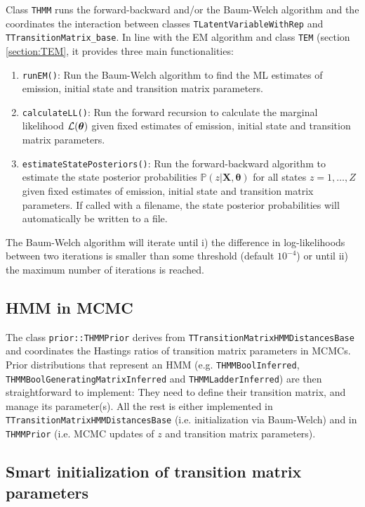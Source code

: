 \documentclass[a4paper,11pt]{article}
\def\X{\boldsymbol{X}}
\def\btheta{\boldsymbol{\theta}}
\def\L{{\cal L}}
\def\p{\mathbb{P}}
\newcommand{\class}[1]{\texttt{#1}}
\newcommand{\pubfunc}[1]{\texttt{#1()}}
\begin{document}
Class \class{THMM} runs the forward-backward and/or the Baum-Welch algorithm and the coordinates the interaction between classes \class{TLatentVariableWithRep} and \class{TTransitionMatrix\_base}. In line with the EM algorithm and class \class{TEM} (section \ref{section:TEM}, it provides three main functionalities:

\begin{enumerate}
 \item \pubfunc{runEM}: Run the Baum-Welch algorithm to find the ML estimates of emission, initial state and transition matrix parameters.
 \item \pubfunc{calculateLL}: Run the forward recursion to calculate the marginal likelihood $\L(\btheta)$ given fixed estimates of emission, initial state and transition matrix parameters.
 \item \pubfunc{estimateStatePosteriors}: Run the forward-backward algorithm to estimate the state posterior probabilities $\p(z | \X, \btheta)$ for all states $z=1, \ldots, Z$ given fixed estimates of emission, initial state and transition matrix parameters. If called with a filename, the state posterior probabilities will automatically be written to a file.
\end{enumerate}

The Baum-Welch algorithm will iterate until i) the difference in log-likelihoods between two iterations is smaller than some threshold (default $10^{-4}$) or until ii) the maximum number of iterations is reached.

\subsection{HMM in MCMC}
The class \class{prior::THMMPrior} derives from \class{TTransitionMatrixHMMDistancesBase} and coordinates the Hastings ratios of transition matrix parameters in MCMCs. Prior distributions that represent an HMM (e.g. \class{THMMBoolInferred}, \class{THMMBoolGeneratingMatrixInferred} and \class{THMMLadderInferred}) are then straightforward to implement: They need to define their transition matrix, and manage its parameter(s). All the rest is either implemented in \class{TTransitionMatrixHMMDistancesBase} (i.e. initialization via Baum-Welch) and in \class{THMMPrior} (i.e. MCMC updates of $z$ and transition matrix parameters).

\subsection{Smart initialization of transition matrix parameters}
\end{document}
